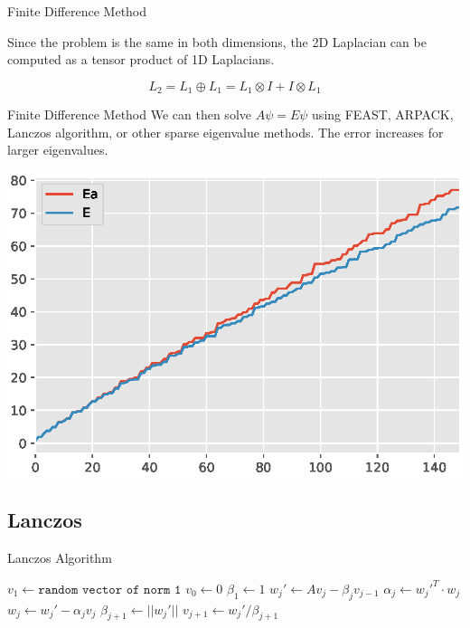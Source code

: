 \documentclass[mathserif]{beamer}
\begin{document}
\begin{frame}{Finite Difference Method}

 Since the problem is the same in both dimensions, the 2D Laplacian
 can be computed as a tensor product of 1D Laplacians.

 \[ L_2 = L_1 \oplus L_1 = L_1 \otimes I + I \otimes L_1  \]

\end{frame}


\begin{frame}{Finite Difference Method}
 We can then solve \(A \psi = E \psi \) using FEAST, ARPACK, Lanczos algorithm,
 or other sparse eigenvalue methods. The error increases for larger eigenvalues.

 \centering
 \includegraphics[scale=0.5]{images/EEa.eps}

\end{frame}


\subsection{Lanczos}

\begin{frame}{Lanczos Algorithm}

 \begin{algorithmic}
  \STATE{} \(v_1 \gets \texttt{random vector of norm 1} \)
  \STATE{} \(v_0 \gets 0 \)
  \STATE{} \(\beta_1 \gets 1 \)
    \STATE{} \(w_j' \gets Av_j - \beta_j v_{j-1} \)
    \STATE{} \(\alpha_j \gets {w_j'}^T \cdot w_j \)
    \STATE{} \(w_j \gets w_j' - \alpha_j v_{j} \)
    \STATE{} \(\beta_{j+1} \gets ||w_j'|| \)
    \STATE{} \(v_{j+1} \gets w_j'/\beta_{j+1} \)
  \ENDFOR{}
 \end{algorithmic}

\end{frame}
\end{document}
